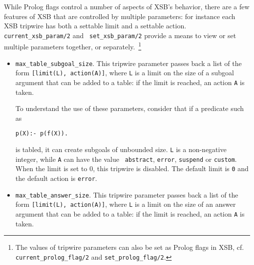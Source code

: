 \begin{description}
    

%
While Prolog flags control a number of aspects of XSB's behavior,
there are a few features of XSB that are controlled by multiple
parameters: for instance each XSB tripwire has both a settable limit
and a settable action.  {\tt current\_xsb\_param/2} and {\tt
  set\_xsb\_param/2} provide a means to view or set multiple
parameters together, or separately.~\footnote{The values of tripwire
  parameters can also be set as Prolog flags in XSB, cf. {\tt
    current\_prolog\_flag/2} and {\tt set\_prolog\_flag/2}.}

\begin{itemize}
\item {\tt max\_table\_subgoal\_size}.  This tripwire parameter passes
 back a list of the form {\tt [limit(L), action(A)]}, where {\tt L} is a
 limit on the size of a subgoal argument that can be added to a table:
 if the limit is reached, an action {\tt A} is taken.

 To understand the use of these parameters, consider that if a
 predicate such as
\begin{verbatim}
p(X):- p(f(X)).
\end{verbatim}
  is tabled, it can create subgoals of unbounded size.  {\tt L} is a
 non-negative integer, while {\tt A} can have the value {\tt
 abstract}, {\tt error}, {\tt suspend} or {\tt custom}.  When the
 limit is set to 0, this tripwire is disabled.  The default limit is
 {\tt 0} and the default action is {\tt error}.

\item {\tt max\_table\_answer\_size}.  This tripwire parameter passes
 back a list of the form {\tt [limit(L), action(A)]}, where {\tt L} is a
 limit on the size of an answer argument that can be added to a table:
 if the limit is reached, an action {\tt A} is taken.


\end{itemize}
\end{description}
